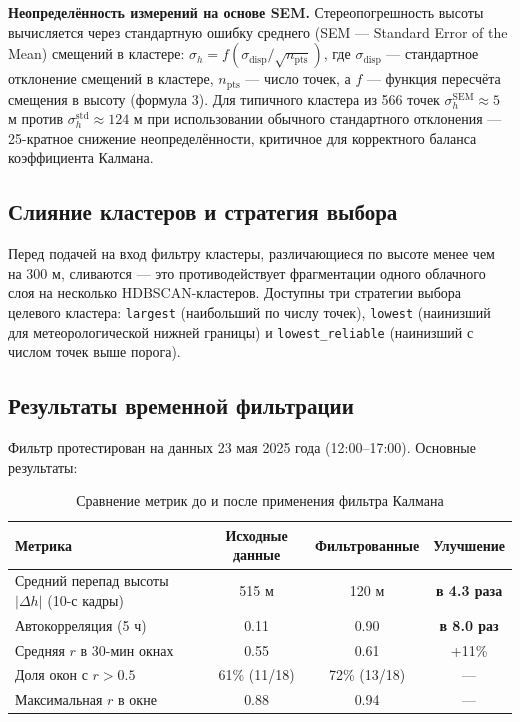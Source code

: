 \documentclass[11pt]{article} %
\begin{document}
	\textbf{Неопределённость измерений на основе SEM.} Стереопогрешность высоты вычисляется через стандартную ошибку среднего (SEM --- Standard Error of the Mean) смещений в кластере: $\sigma_h = f(\sigma_{\text{disp}} / \sqrt{n_\text{pts}})$, где $\sigma_{\text{disp}}$ --- стандартное отклонение смещений в кластере, $n_\text{pts}$ --- число точек, а $f$ --- функция пересчёта смещения в высоту (формула 3). Для типичного кластера из 566 точек $\sigma_h^{\text{SEM}} \approx 5$ м против $\sigma_h^{\text{std}} \approx 124$ м при использовании обычного стандартного отклонения — 25-кратное снижение неопределённости, критичное для корректного баланса коэффициента Калмана.
	
	\subsection{Слияние кластеров и стратегия выбора}
	
	Перед подачей на вход фильтру кластеры, различающиеся по высоте менее чем на 300 м, сливаются — это противодействует фрагментации одного облачного слоя на несколько HDBSCAN-кластеров. Доступны три стратегии выбора целевого кластера: \texttt{largest} (наибольший по числу точек), \texttt{lowest} (наинизший для метеорологической нижней границы) и \texttt{lowest\_reliable} (наинизший с числом точек выше порога).
	
	\subsection{Результаты временной фильтрации}
	
	Фильтр протестирован на данных 23 мая 2025 года (12:00--17:00). Основные результаты:

	\vspace{2mm}
	\begin{table}[h!]
		\centering
		\begin{tabular}{||l c c c||} 
			\hline
			Метрика & Исходные данные & Фильтрованные & Улучшение \\
			\hline\hline
			Средний перепад высоты $|\Delta h|$ (10-с кадры) & 515 м & 120 м & \textbf{в 4.3 раза} \\
			Автокорреляция (5 ч) & 0.11 & 0.90 & \textbf{в 8.0 раз} \\
			Средняя $r$ в 30-мин окнах & 0.55 & 0.61 & +11\% \\
			Доля окон с $r > 0.5$ & 61\% (11/18) & 72\% (13/18) & --- \\
			Максимальная $r$ в окне & 0.88 & 0.94 & --- \\
			\hline
		\end{tabular}
		\caption{Сравнение метрик до и после применения фильтра Калмана}
		\label{table:2}
	\end{table}
	
\end{document}
